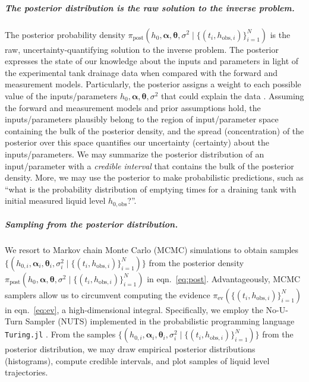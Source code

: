 \documentclass[openacc]{rsproca_new}%
\newcommand\thedatanomath {\{(t_i,h_{\text{obs}, i})\}_{i=1}^{N}}
\begin{document}
\subparagraph{The posterior distribution is the raw solution to the inverse problem.}
The posterior probability density $\pi_{\text{post}}(h_0, \boldsymbol \alpha, \boldsymbol \theta, \sigma^2 \mid \thedatanomath)$ is the raw, uncertainty-quantifying solution to the inverse problem.
The posterior expresses the state of our knowledge about the inputs and parameters in light of the experimental tank drainage data when compared with the forward and measurement models. 
Particularly, the posterior assigns a weight to each possible value of the inputs/parameters $h_0, \boldsymbol \alpha, \boldsymbol \theta, \sigma^2$ that could explain the data \cite{dashti2013bayesian}. 
Assuming the forward and measurement models and prior assumptions hold, the inputs/parameters plausibly belong to the region of input/parameter space containing the bulk of the posterior density, and the spread (concentration) of the posterior over this space quantifies our uncertainty (certainty) about the inputs/parameters.
We may summarize the posterior distribution of an input/parameter with a \emph{credible interval} that contains the bulk of the posterior density. 
More, we may use the posterior to make probabilistic predictions, such as ``what is the probability distribution of emptying times for a draining tank with initial measured liquid level $h_{0, \text{obs}}$?''.

\subparagraph{Sampling from the posterior distribution.} We resort to Markov chain Monte Carlo (MCMC) simulations \cite{robert1999monte} to obtain samples $\{(h_{0, i}, \boldsymbol \alpha_i, \boldsymbol \theta_i, \sigma_i^2 \mid \thedatanomath)\}$ from the posterior density $\pi_{\text{post}}(h_0, \boldsymbol \alpha, \boldsymbol \theta, \sigma^2 \mid \thedatanomath)$ in eqn.~\ref{eq:post}. Advantageously, MCMC samplers allow us to circumvent computing the evidence $\pi_{\text{ev}}(\thedatanomath)$ in eqn.~\ref{eq:ev}, a high-dimensional integral. Specifically, we employ the No-U-Turn Sampler (NUTS) \cite{hoffman2014no} implemented in the probabilistic programming language \cite{gordon2014probabilistic} \texttt{Turing.jl} \cite{ge2018turing}. From the samples $\{(h_{0, i}, \boldsymbol \alpha_i, \boldsymbol \theta_i, \sigma_i^2 \mid \thedatanomath)\}$ from the posterior distribution, we may draw empirical posterior distributions (histograms), compute credible intervals, and plot samples of liquid level trajectories.
\end{document}
